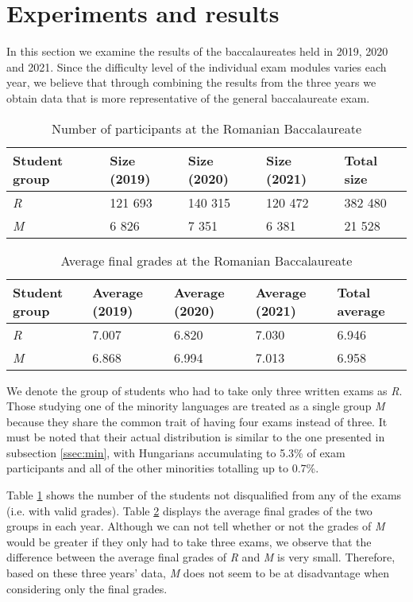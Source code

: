 \section{Experiments and results}

In this section we examine the results of the baccalaureates held in 2019, 2020 and 2021. Since the difficulty level of the individual exam modules varies each year, we believe that through combining the results from the three years we obtain data that is more representative of the general baccalaureate exam.

\begin{table}[!b]
  \caption{Number of participants at the Romanian Baccalaureate}
  \label{group-size}
  \centering
  \begin{tabular}{l|llll}
    \toprule
    Student group & Size (2019) & Size (2020) & Size (2021) & Total size \\
    \midrule
    \textit{R} & 121 693 & 140 315 & 120 472 & 382 480 \\
    \textit{M} & 6 826 & 7 351 & 6 381  & 21 528 \\
    \bottomrule
  \end{tabular}
\end{table}

\begin{table}[!b]
  \caption{Average final grades at the Romanian Baccalaureate}
  \label{group-average}
  \centering
  \begin{tabular}{l|llll}
    \toprule
    Student group & Average (2019) & Average (2020) & Average (2021) & Total average \\
    \midrule
    \textit{R} & 7.007 & 6.820 & 7.030 & 6.946 \\
    \textit{M} & 6.868 & 6.994 & 7.013 & 6.958 \\
    \bottomrule
  \end{tabular}
\end{table}

We denote the group of students who had to take only three written exams as \textit{R}. Those studying one of the minority languages are treated as a single group \textit{M} because they share the common trait of having four exams instead of three. It must be noted that their actual distribution is similar to the one presented in subsection \ref{ssec:min}, with Hungarians accumulating to 5.3\% of exam participants and all of the other minorities totalling up to 0.7\%. 

Table \ref{group-size} shows the number of the students not disqualified from any of the exams (i.e. with valid grades). Table \ref{group-average} displays the average final grades of the two groups in each year. Although we can not tell whether or not the grades of \textit{M} would be greater if they only had to take three exams, we observe that the difference between the average final grades of \textit{R} and \textit{M} is very small. Therefore, based on these three years' data, \textit{M} does not seem to be at disadvantage when considering only the final grades.
 
